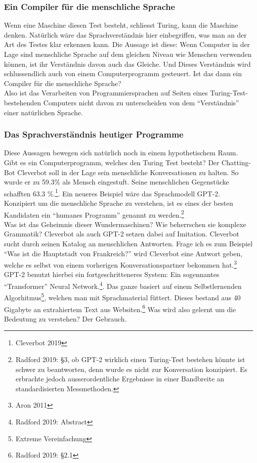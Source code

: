 \documentclass[10pt,a4paper]{article}
\begin{document}
\subsubsection{Ein Compiler für die menschliche Sprache}
Wenn eine Maschine diesen Test besteht, schliesst Turing, kann die Maschine denken. Natürlich wäre das Sprachverständnis hier einbegriffen, was man an der Art des Testes klar erkennen kann. Die Aussage ist diese: Wenn Computer in der Lage sind menschliche Sprache auf dem gleichen Niveau wie Menschen verwenden können, ist ihr Verständnis davon auch das Gleiche. Und Dieses Verständnis wird schlussendlich auch von einem Computerprogramm gesteuert. Ist das dann ein Compiler für die menschliche Sprache? \\
Also ist das Verarbeiten von Programmiersprachen auf Seiten eines Turing-Test-bestehenden Computers nicht davon zu unterscheiden von dem \enquote{Verständnis} einer natürlichen Sprache. \\


\subsubsection{Das Sprachverständnis heutiger Programme}
Diese Aussagen bewegen sich natürlich noch in einem hypothetischem Raum. Gibt es ein Computerprogramm, welches den Turing Test besteht? Der Chatting-Bot Cleverbot soll in der Lage sein menschliche Konversationen zu halten. So wurde er zu 59.3\% als Mensch eingestuft. Seine menschlichen Gegenstücke schafften 63.3 \%.\footnote{Cleverbot 2019}. Ein neueres Beispiel wäre das Sprachmodell GPT-2. Konzipiert um die menschliche Sprache zu verstehen, ist es eines der besten Kandidaten ein \enquote{humanes Programm} genannt zu werden.\footnote{Radford 2019: §3, ob GPT-2 wirklich einen Turing-Test bestehen könnte ist schwer zu beantworten, denn wurde es nicht zur Konversation konzipiert. Es erbrachte jedoch ausserordentliche Ergebnisse in einer Bandbreite an standardisierten Messmethoden.} \\
Was ist das Geheimnis dieser Wundermaschinen? Wie beherrschen sie komplexe Grammatik? Cleverbot als auch GPT-2 setzen dabei auf Imitation. Cleverbot sucht durch seinen Katalog an menschlichen Antworten. Frage ich es zum Beispiel \enquote{Was ist die Hauptstadt von Frankreich?} wird Cleverbot eine Antwort geben, welche es selbst von einem vorherigen Konversationspartner bekommen hat.\footnote{Aron 2011} GPT-2 benutzt hierbei ein fortgeschritteneres System: Ein sogennantes \enquote{Transformer} Neural Network.\footnote{Radford 2019: Abstract}. Das ganze basiert auf einem Selbstlernenden Algorhitmus\footnote{Extreme Vereinfachung}, welchen man mit Sprachmaterial füttert. Dieses bestand aus 40 Gigabyte an extrahiertem Text aus Websiten.\footnote{Radford 2019: §2.1} Was wird also gelernt um die Bedeutung zu verstehen? Der Gebrauch.
\end{document}
